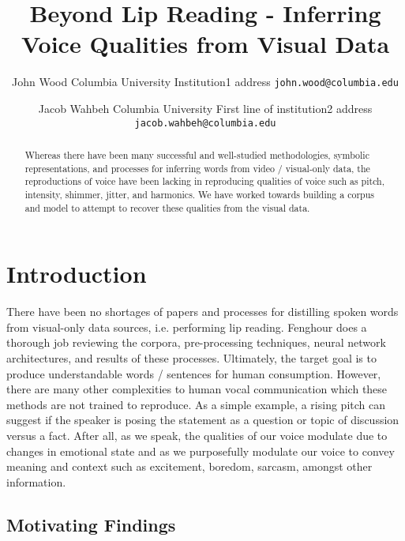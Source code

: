 \documentclass[10pt,twocolumn,letterpaper]{article}
\begin{document}
\title{Beyond Lip Reading - Inferring Voice Qualities from Visual Data}

\author{John Wood
Columbia University
Institution1 address
{\tt\small john.wood@columbia.edu}
\and Jacob Wahbeh
Columbia University
First line of institution2 address
{\tt\small jacob.wahbeh@columbia.edu}
}
\maketitle

\begin{abstract}
   Whereas there have been many successful and well-studied methodologies, symbolic representations, and processes for inferring words from video / visual-only data, the reproductions of voice have been lacking in reproducing qualities of voice such as pitch, intensity, shimmer, jitter, and harmonics. We have worked towards building a corpus and model to attempt to recover these qualities from the visual data.
\end{abstract}

\section{Introduction}
\label{sec:intro}

There have been no shortages of papers and processes for distilling spoken words from visual-only data sources, i.e. performing lip reading. Fenghour  \cite{Fenghour2021} does a thorough job reviewing the corpora, pre-processing techniques, neural network architectures, and results of these processes. Ultimately, the target goal is to produce understandable words / sentences for human consumption. However, there are many other complexities to human vocal communication which these methods are not trained to reproduce. As a simple example, a rising pitch can suggest if the speaker is posing the statement as a question or topic of discussion versus a fact. After all, as we speak, the qualities of our voice modulate due to changes in emotional state and as we purposefully modulate our voice to convey meaning and context such as excitement, boredom, sarcasm, amongst other information. 

\subsection{Motivating Findings}
\end{document}
